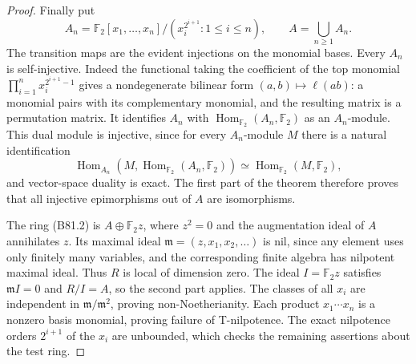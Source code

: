 \begin{proof}
Finally put
\[
 A_n=\mathbb F_2[x_1,\ldots,x_n]/
                (x_i^{2^{i+1}}:1\le i\le n),
 \qquad A=\bigcup_{n\ge1}A_n.                            \tag{B81.5}
\]
The transition maps are the evident injections on the monomial
bases. Every $A_n$ is self-injective. Indeed the functional taking
the coefficient of the top monomial
$\prod_{i=1}^n x_i^{2^{i+1}-1}$ gives a nondegenerate bilinear form
$(a,b)\mapsto\ell(ab)$: a monomial pairs with its complementary
monomial, and the resulting matrix is a permutation matrix.
It identifies $A_n$ with $\operatorname{Hom}_{\mathbb F_2}
(A_n,\mathbb F_2)$ as an $A_n$-module. This dual module is injective,
since for every $A_n$-module $M$ there is a natural identification
\[
 \operatorname{Hom}_{A_n}
       (M,\operatorname{Hom}_{\mathbb F_2}(A_n,\mathbb F_2))
       \simeq\operatorname{Hom}_{\mathbb F_2}(M,\mathbb F_2),
\]
and vector-space duality is exact. The first part of the theorem
therefore proves that all injective epimorphisms out of $A$ are
isomorphisms.

The ring (B81.2) is $A\oplus\mathbb F_2z$, where $z^2=0$ and the
augmentation ideal of $A$ annihilates $z$. Its maximal ideal
$\mathfrak m=(z,x_1,x_2,\ldots)$ is nil, since any element uses only
finitely many variables, and the corresponding finite algebra has
nilpotent maximal ideal. Thus $R$ is local of dimension zero.
The ideal $I=\mathbb F_2z$ satisfies $\mathfrak mI=0$ and $R/I=A$,
so the second part applies. The classes of all $x_i$ are independent
in $\mathfrak m/\mathfrak m^2$, proving non-Noetherianity. Each product
$x_1\cdots x_n$ is a nonzero basis monomial, proving failure of
T-nilpotence. The exact nilpotence orders $2^{i+1}$ of the $x_i$ are
unbounded, which checks the remaining assertions about the test ring.
\end{proof}
